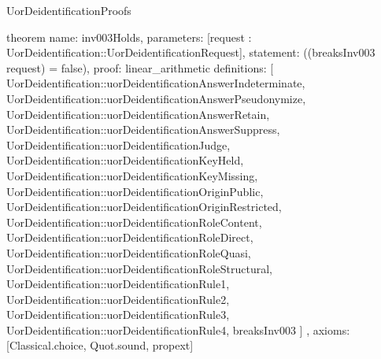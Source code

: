 \begin{lexlean}{UorDeidentificationProofs}
\begin{semanticmodule}
theorem{
  name: inv003Holds,
  parameters: [request : UorDeidentification::UorDeidentificationRequest],
  statement: ((breaksInv003 request) = false),
  proof: linear_arithmetic{
    definitions: [
      UorDeidentification::uorDeidentificationAnswerIndeterminate,
      UorDeidentification::uorDeidentificationAnswerPseudonymize,
      UorDeidentification::uorDeidentificationAnswerRetain,
      UorDeidentification::uorDeidentificationAnswerSuppress,
      UorDeidentification::uorDeidentificationJudge,
      UorDeidentification::uorDeidentificationKeyHeld,
      UorDeidentification::uorDeidentificationKeyMissing,
      UorDeidentification::uorDeidentificationOriginPublic,
      UorDeidentification::uorDeidentificationOriginRestricted,
      UorDeidentification::uorDeidentificationRoleContent,
      UorDeidentification::uorDeidentificationRoleDirect,
      UorDeidentification::uorDeidentificationRoleQuasi,
      UorDeidentification::uorDeidentificationRoleStructural,
      UorDeidentification::uorDeidentificationRule1,
      UorDeidentification::uorDeidentificationRule2,
      UorDeidentification::uorDeidentificationRule3,
      UorDeidentification::uorDeidentificationRule4,
      breaksInv003
    ]
  },
  axioms: [Classical.choice, Quot.sound, propext]
}
\end{semanticmodule}
\end{lexlean}
